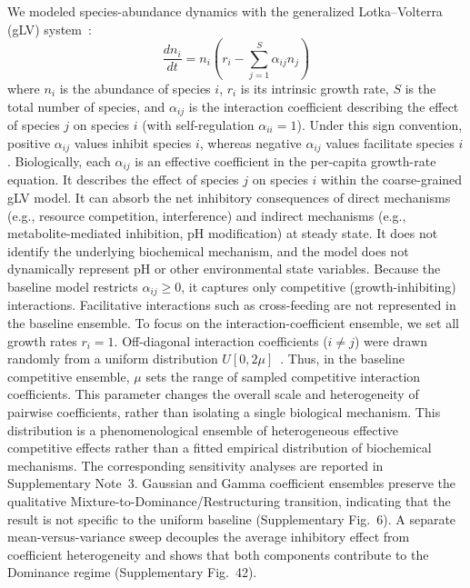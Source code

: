 We modeled species-abundance dynamics with the generalized Lotka--Volterra (gLV) system~\citep{May1972,Grilli2017}:
\begin{equation}
\frac{dn_i}{dt} = n_i \left( r_i - \sum_{j=1}^{S} \alpha_{ij} n_j \right)
\label{eq:glv}
\end{equation}
where $n_i$ is the abundance of species $i$, $r_i$ is its intrinsic growth rate, $S$ is the total number of species, and $\alpha_{ij}$ is the interaction coefficient describing the effect of species $j$ on species $i$ (with self-regulation $\alpha_{ii} = 1$). Under this sign convention, positive $\alpha_{ij}$ values inhibit species $i$, whereas negative $\alpha_{ij}$ values facilitate species $i$. Biologically, each $\alpha_{ij}$ is an effective coefficient in the per-capita growth-rate equation. It describes the effect of species $j$ on species $i$ within the coarse-grained gLV model. It can absorb the net inhibitory consequences of direct mechanisms (e.g., resource competition, interference) and indirect mechanisms (e.g., metabolite-mediated inhibition, pH modification) at steady state. It does not identify the underlying biochemical mechanism, and the model does not dynamically represent pH or other environmental state variables. Because the baseline model restricts $\alpha_{ij} \geq 0$, it captures only competitive (growth-inhibiting) interactions. Facilitative interactions such as cross-feeding are not represented in the baseline ensemble. To focus on the interaction-coefficient ensemble, we set all growth rates $r_i = 1$. Off-diagonal interaction coefficients ($i \neq j$) were drawn randomly from a uniform distribution $U[0, 2\mu]$~\citep{Hu2022,Hu2025}. Thus, in the baseline competitive ensemble, $\mu$ sets the range of sampled competitive interaction coefficients. This parameter changes the overall scale and heterogeneity of pairwise coefficients, rather than isolating a single biological mechanism. This distribution is a phenomenological ensemble of heterogeneous effective competitive effects rather than a fitted empirical distribution of biochemical mechanisms. The corresponding sensitivity analyses are reported in Supplementary Note~3. Gaussian and Gamma coefficient ensembles preserve the qualitative Mixture-to-Dominance/Restructuring transition, indicating that the result is not specific to the uniform baseline (Supplementary Fig.~6). A separate mean-versus-variance sweep decouples the average inhibitory effect from coefficient heterogeneity and shows that both components contribute to the Dominance regime (Supplementary Fig.~42).

